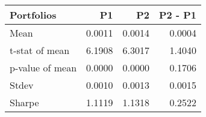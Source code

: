 \begin{tabular}{lrrr}
\toprule
Portfolios & P1 & P2 & P2 - P1 \\
\midrule
Mean & 0.0011 & 0.0014 & 0.0004 \\
t-stat of mean & 6.1908 & 6.3017 & 1.4040 \\
p-value of mean & 0.0000 & 0.0000 & 0.1706 \\
Stdev & 0.0010 & 0.0013 & 0.0015 \\
Sharpe & 1.1119 & 1.1318 & 0.2522 \\
\bottomrule
\end{tabular}
